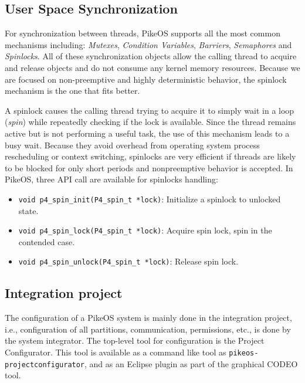 \subsection{User Space Synchronization}\label{sec:spinlocks}
For synchronization between threads, PikeOS supports all the most common mechanisms including: \emph{Mutexes}, \emph{Condition Variables}, \emph{Barriers}, \emph{Semaphores} and \emph{Spinlocks}. All of these synchronization objects allow the calling thread to acquire and release objects and do not consume any kernel memory resources. Because we are focused on non-preemptive and highly deterministic behavior, the spinlock mechanism is the one that fits better.  
\par A spinlock causes the calling thread trying to acquire it to simply wait in a loop (\emph{spin}) while repeatedly checking if the lock is available. Since the thread remains active but is not performing a useful task, the use of this mechanism leads to a busy wait. Because they avoid overhead from operating system process rescheduling or context switching, spinlocks are very efficient if threads are likely to be blocked for only short periods and nonpreemptive behavior is accepted. In PikeOS, three API call are available for spinlocks handling:
\begin{itemize}
\item \verb|void p4_spin_init(P4_spin_t *lock)|: Initialize a spinlock to unlocked state.
\item \verb|void p4_spin_lock(P4_spin_t *lock)|: Acquire spin lock, spin in the contended case.
\item \verb|void p4_spin_unlock(P4_spin_t *lock)|: Release spin lock.
\end{itemize}

\subsection{Integration project}
\label{sec:IntegrationProject}
The configuration of a PikeOS system is mainly done in the integration project, i.e., configuration of all partitions, communication, permissions, etc., is done by the system integrator. The top-level tool for configuration is the Project Configurator. This tool is available as a command like tool as \verb|pikeos-projectconfigurator|, and as an Eclipse plugin as part of the graphical CODEO tool.


